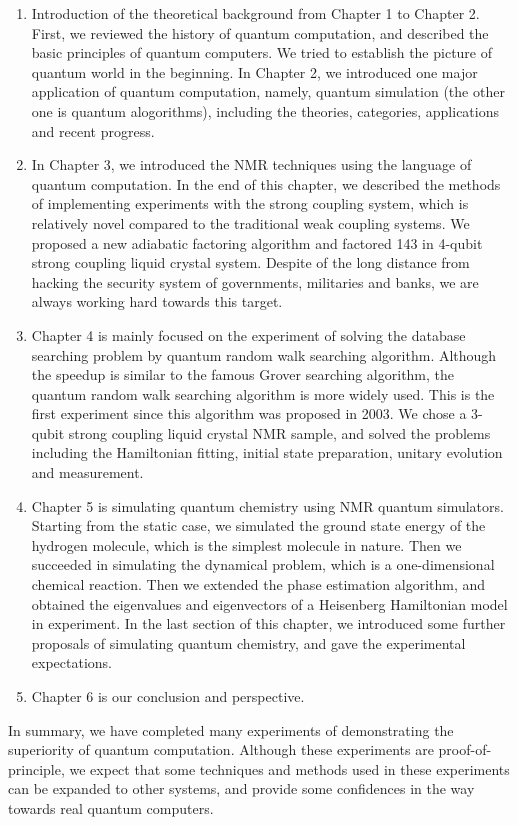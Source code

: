 \begin{englishabstract}
\begin{enumerate}
  \item Introduction of the theoretical background from Chapter 1 to Chapter 2. First, we reviewed the history of quantum computation, and described the basic principles of quantum computers. We tried to establish the picture of quantum world in the beginning. In Chapter 2, we introduced one major application of quantum computation, namely, quantum simulation (the other one is quantum alogorithms), including the theories, categories, applications and recent progress.
   \item
      In Chapter 3, we introduced the NMR techniques using the language of quantum computation. In the end of this chapter, we described the methods of implementing experiments with the strong coupling system, which is relatively novel compared to the traditional weak coupling systems. We proposed a new adiabatic factoring algorithm and factored 143 in 4-qubit strong coupling liquid crystal system. Despite of the long distance from hacking the security system of governments, militaries and banks, we are always working hard towards this target.
   \item Chapter 4 is mainly focused on the experiment of solving the database searching problem by quantum random walk searching algorithm. Although the speedup is similar to the famous Grover searching algorithm, the quantum random walk searching algorithm is more widely used. This is the first experiment since this algorithm was proposed in 2003. We chose a 3-qubit strong coupling liquid crystal NMR sample, and solved the problems including the Hamiltonian fitting, initial state preparation, unitary evolution and measurement.
    \item Chapter 5 is simulating quantum chemistry using NMR quantum simulators. Starting from the static case, we simulated the ground state energy of the hydrogen molecule, which is the simplest molecule in nature. Then we succeeded in simulating the dynamical problem, which is a one-dimensional chemical reaction. Then we extended the phase estimation algorithm, and obtained the eigenvalues and eigenvectors of a Heisenberg Hamiltonian model in experiment. In the last section of this chapter, we introduced some further proposals of simulating quantum chemistry, and gave the experimental expectations.

         \item    Chapter 6 is our conclusion and perspective.
\end{enumerate}

In summary, we have completed many experiments of demonstrating the superiority of quantum computation. Although these experiments are proof-of-principle, we expect that some techniques and methods used in these experiments can be expanded to other systems, and provide some confidences in the way towards real quantum computers.

\end{englishabstract}
